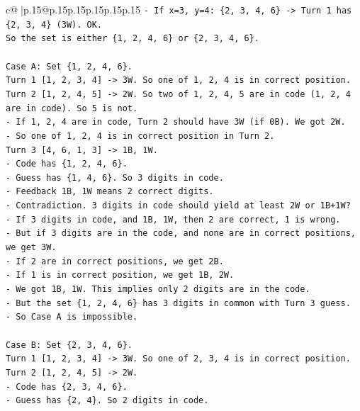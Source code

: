 \documentclass{article}
\begin{document}
{\begin{supertabular}{c@{$\;$}|p{.15\linewidth}@{}p{.15\linewidth}p{.15\linewidth}p{.15\linewidth}p{.15\linewidth}p{.15\linewidth}}
{{{\texttt{{-} If x=3, y=4: \{2, 3, 4, 6\} {-}> Turn 1 has \{2, 3, 4\} (3W). OK.} \\
\texttt{So the set is either \{1, 2, 4, 6\} or \{2, 3, 4, 6\}.} \\
\\ 
\texttt{Case A: Set \{1, 2, 4, 6\}.} \\
\texttt{Turn 1 {[}1, 2, 3, 4{]} {-}> 3W. So one of 1, 2, 4 is in correct position.} \\
\texttt{Turn 2 {[}1, 2, 4, 5{]} {-}> 2W. So two of 1, 2, 4, 5 are in code (1, 2, 4 are in code). So 5 is not.} \\
\texttt{{-} If 1, 2, 4 are in code, Turn 2 should have 3W (if 0B). We got 2W.} \\
\texttt{{-} So one of 1, 2, 4 is in correct position in Turn 2.} \\
\texttt{Turn 3 {[}4, 6, 1, 3{]} {-}> 1B, 1W.} \\
\texttt{{-} Code has \{1, 2, 4, 6\}.} \\
\texttt{{-} Guess has \{1, 4, 6\}. So 3 digits in code.} \\
\texttt{{-} Feedback 1B, 1W means 2 correct digits.} \\
\texttt{{-} Contradiction. 3 digits in code should yield at least 2W or 1B+1W?} \\
\texttt{{-} If 3 digits in code, and 1B, 1W, then 2 are correct, 1 is wrong.} \\
\texttt{{-} But if 3 digits are in the code, and none are in correct positions, we get 3W.} \\
\texttt{{-} If 2 are in correct positions, we get 2B.} \\
\texttt{{-} If 1 is in correct position, we get 1B, 2W.} \\
\texttt{{-} We got 1B, 1W. This implies only 2 digits are in the code.} \\
\texttt{{-} But the set \{1, 2, 4, 6\} has 3 digits in common with Turn 3 guess.} \\
\texttt{{-} So Case A is impossible.} \\
\\ 
\texttt{Case B: Set \{2, 3, 4, 6\}.} \\
\texttt{Turn 1 {[}1, 2, 3, 4{]} {-}> 3W. So one of 2, 3, 4 is in correct position.} \\
\texttt{Turn 2 {[}1, 2, 4, 5{]} {-}> 2W.} \\
\texttt{{-} Code has \{2, 3, 4, 6\}.} \\
\texttt{{-} Guess has \{2, 4\}. So 2 digits in code.} \\
}}}
\end{supertabular}}
\end{document}
